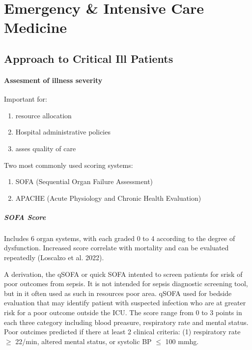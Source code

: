 \documentclass[
  letterpaper,
  DIV=11,
  numbers=noendperiod]{scrreprt}
\let\oldparagraph\paragraph
\renewcommand{\paragraph}[1]{\oldparagraph{#1}\mbox{}}
\begin{document}
\chapter{Emergency \& Intensive Care
Medicine}\label{emergency-intensive-care-medicine}

\section{Approach to Critical Ill
Patients}\label{approach-to-critical-ill-patients}

\subsubsection{Assesment of illness
severity}\label{assesment-of-illness-severity}

Important for:

\begin{enumerate}
\def\labelenumi{\arabic{enumi}.}
\item
  resource allocation
\item
  Hospital administrative policies
\item
  asses quality of care
\end{enumerate}

Two most commonly used scoring systems:

\begin{enumerate}
\def\labelenumi{\arabic{enumi}.}
\item
  SOFA (Sequential Organ Failure Assessment)
\item
  APACHE (Acute Physiology and Chronic Health Evaluation)
\end{enumerate}

\paragraph{SOFA Score}\label{sofa-score}

Includes 6 organ systems, with each graded 0 to 4 according to the
degree of dysfunction. Increased score correlate with mortality and can
be evaluated repeatedly (Loscalzo et al. 2022).

A derivation, the qSOFA or quick SOFA intented to screen patients for
srisk of poor outcomes from sepsis. It is not intended for sepsis
diagnostic screening tool, but in it often used as such in resources
poor area. qSOFA used for bedside evaluation that may identify patient
with suspected infection who are at greater risk for a poor outcome
outside the ICU. The score range from 0 to 3 points in each three
category including blood preasure, respiratory rate and mental status.
Poor outcimes predicted if there at least 2 clinical criteria: (1)
respiratory rate \(\geq\) 22/min, altered mental status, or systolic BP
\(\le\) 100 mmhg.
\end{document}

